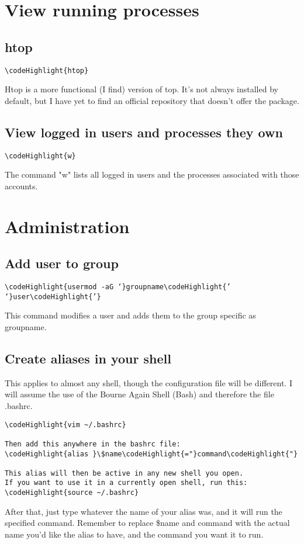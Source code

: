 \documentclass[12pt,a4paper]{article}
\begin{document}
\section{View running processes}
\label{View running processes}
\subsection{htop}
\begin{Verbatim}[commandchars=\\\{\}]
\codeHighlight{htop}
\end{Verbatim}
Htop is a more functional (I find) version of top.  It's not always installed by default, but I have yet to find an official repository that doesn't offer the package.

\subsection{View logged in users and processes they own}
\begin{Verbatim}[commandchars=\\\{\}]
\codeHighlight{w}
\end{Verbatim}
The command "w" lists all logged in users and the processes associated with those accounts.

\section{Administration}
\label{Administration}

\subsection{Add user to group}
\begin{Verbatim}[commandchars=\\\{\}]
\codeHighlight{usermod -aG ‘}groupname\codeHighlight{’ ‘}user\codeHighlight{’}
\end{Verbatim}
This command modifies a user and adds them to the group specific as groupname.

\subsection{Create aliases in your shell}
\label{aliases}
This applies to almost any shell, though the configuration file will be different. I will assume the use of the Bourne Again Shell (Bash) and therefore the file .bashrc.
\begin{Verbatim}[commandchars=\\\{\}]
\codeHighlight{vim ~/.bashrc}

Then add this anywhere in the bashrc file:
\codeHighlight{alias }\$name\codeHighlight{="}command\codeHighlight{"}

This alias will then be active in any new shell you open.
If you want to use it in a currently open shell, run this:
\codeHighlight{source ~/.bashrc}
\end{Verbatim}
After that, just type whatever the name of your alias was, and it will run the specified command. Remember to replace \$name and command with the actual name you'd like the alias to have, and the command you want it to run.
\end{document}
